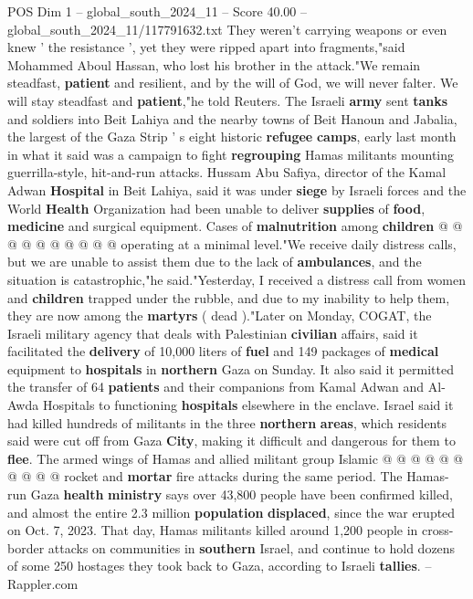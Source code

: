 \begin{textsample}{POS Dim 1 – global\_south\_2024\_11 – Score 40.00 – global\_south\_2024\_11/117791632.txt}
They weren't carrying weapons or even knew ' the resistance ', yet they were ripped apart into fragments,"said Mohammed Aboul Hassan, who lost his brother in the attack."We remain steadfast, \textbf{patient} and resilient, and by the will of God, we will never falter.
We will stay steadfast and \textbf{patient},"he told Reuters.
The Israeli \textbf{army} sent \textbf{tanks} and soldiers into Beit Lahiya and the nearby towns of Beit Hanoun and Jabalia, the largest of the Gaza Strip ' s eight historic \textbf{refugee} \textbf{camps}, early last month in what it said was a campaign to fight \textbf{regrouping} Hamas militants mounting guerrilla-style, hit-and-run attacks.
Hussam Abu Safiya, director of the Kamal Adwan \textbf{Hospital} in Beit Lahiya, said it was under \textbf{siege} by Israeli forces and the World \textbf{Health} Organization had been unable to deliver \textbf{supplies} of \textbf{food}, \textbf{medicine} and surgical equipment.
Cases of \textbf{malnutrition} among \textbf{children} @ @ @ @ @ @ @ @ @ @ operating at a minimal level."We receive daily distress calls, but we are unable to assist them due to the lack of \textbf{ambulances}, and the situation is catastrophic,"he said."Yesterday, I received a distress call from women and \textbf{children} trapped under the rubble, and due to my inability to help them, they are now among the \textbf{martyrs} ( dead )."Later on Monday, COGAT, the Israeli military agency that deals with Palestinian \textbf{civilian} affairs, said it facilitated the \textbf{delivery} of 10,000 liters of \textbf{fuel} and 149 packages of \textbf{medical} equipment to \textbf{hospitals} in \textbf{northern} Gaza on Sunday.
It also said it permitted the transfer of 64 \textbf{patients} and their companions from Kamal Adwan and Al-Awda Hospitals to functioning \textbf{hospitals} elsewhere in the enclave.
Israel said it had killed hundreds of militants in the three \textbf{northern} \textbf{areas}, which residents said were cut off from Gaza \textbf{City}, making it difficult and dangerous for them to \textbf{flee}.
The armed wings of Hamas and allied militant group Islamic @ @ @ @ @ @ @ @ @ @ rocket and \textbf{mortar} fire attacks during the same period.
The Hamas-run Gaza \textbf{health} \textbf{ministry} says over 43,800 people have been confirmed killed, and almost the entire 2.3 million \textbf{population} \textbf{displaced}, since the war erupted on Oct. 7, 2023.
That day, Hamas militants killed around 1,200 people in cross-border attacks on communities in \textbf{southern} Israel, and continue to hold dozens of some 250 hostages they took back to Gaza, according to Israeli \textbf{tallies}. -- Rappler.com

\end{textsample}
